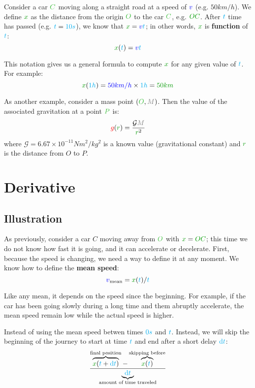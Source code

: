 Consider a car $\posit{C}$ moving along a straight road at a speed of
$\textcolor{blue}{v}$ (e.g. $50km/h$). We define $\dist{x}$ as the distance from
the origin $\posit{O}$ to the car $\posit{C}$, e.g. $\dist{OC}$. After
$\textcolor{cyan}{t}$ time has passed (e.g. $\textcolor{cyan}{t} = \textcolor{cyan}{10s}$), we know
that $\dist{x} = \speed{v} \delay{t}$; in other words, $\dist{x}$ is
\textbf{function} of $\textcolor{cyan}{t}$:
\[
\dist{x}(\delay{t}) = \speed{v} \delay{t}
\]

This notation gives us a general formula to compute $\dist{x}$ for any
given value of $\textcolor{cyan}{t}$. For example:
\[
\dist{x}(\delay{1h})
= \speed{50km/h} \times \delay{1h}
= \dist{50 km}
\]

As another example, consider a mass point $(\posit{O}, \mass{M})$. Then
the value of the associated gravitation at a point $\posit{P}$ is:
\[
\accel{g}(\dist{r}) = \frac {\mathcal G \mass{M}} {\dist{r}^2}
\]
where $\mathcal G = 6.67 \times 10^{-11} N m^2/kg^2$ is a known value
(gravitational constant) and $\dist{r}$ is the distance from $O$ to $P$.



\section{Derivative}


\subsection{Illustration}

As previously, consider a car $C$ moving away from $\posit{O}$ with
$\dist{x} = \dist{OC}$; this time we do not know how fast it is going, and
it can accelerate or decelerate. First, because the speed is changing,
we need a way to define it at any moment. We know how to define the
\textbf{mean speed}:
\[
\speed{v}_{\mathrm{mean}} = \dist{x}(\delay{t}) / \delay{t}
\]

Like any mean, it depends on the speed since the beginning. For example,
if the car has been going slowly during a long time and them abruptly
accelerate, the mean speed remain low while the actual speed is higher.

Instead of using the mean speed betwen times $\textcolor{cyan}{0s}$ and
$\textcolor{cyan}{t}$. Instead, we will skip the beginning of the journey to start
at time $\textcolor{cyan}{t}$ and end after a short delay $\textcolor{cyan}{\mathrm{d} t}$:
\[
\frac {
	\overbrace{\dist{x}(\delay{t}+\delay{\dt})}^{\text{final position}}
	- \overbrace{\dist{x}(\delay{t})}^{\text{skipping before}}
} {\underbrace{\delay{\dt}}_{\text{amount of time traveled}}}
\]

